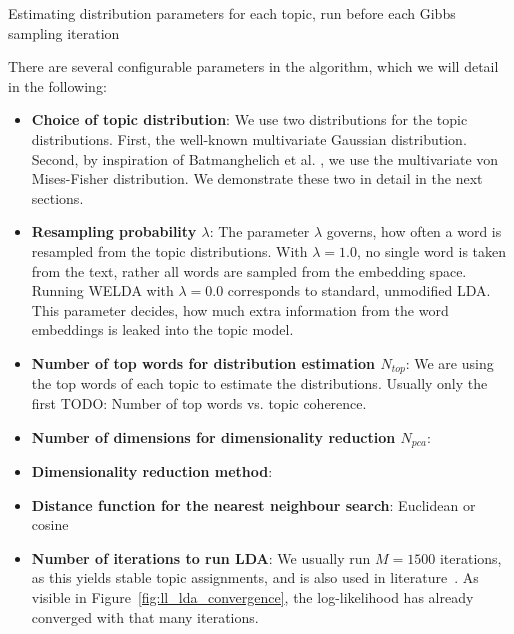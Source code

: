 \documentclass[
        a4paper,
        titlepage,
        twoside,
        parskip
        ]{scrbook}
\theoremstyle{break}
\begin{document}
\begin{algorithm}
  \caption{Estimating distribution parameters for each topic, run before each Gibbs sampling iteration}
  \label{alg:welda_parameter_estimation}
  \begin{algorithmic}[1]
    \EndFor
    \EndProcedure
  \end{algorithmic}
\end{algorithm}

There are several configurable parameters in the algorithm, which we will detail in the following:
\begin{itemize}
  \item \textbf{Choice of topic distribution}:
    We use two distributions for the topic distributions.
    First, the well-known multivariate Gaussian distribution.
    Second, by inspiration of Batmanghelich et al. \cite{Batmanghelich2016}, we use the multivariate von Mises-Fisher distribution.
    We demonstrate these two in detail in the next sections.
  \item \textbf{Resampling probability $\lambda$}:
    The parameter $\lambda$ governs, how often a word is resampled from the topic distributions.
    With $\lambda = 1.0$, no single word is taken from the text, rather all words are sampled from the embedding space.
    Running WELDA with $\lambda = 0.0$ corresponds to standard, unmodified LDA.
    This parameter decides, how much extra information from the word embeddings is leaked into the topic model.
  \item \textbf{Number of top words for distribution estimation $N_{top}$}:
    We are using the top words of each topic to estimate the distributions.
    Usually only the first
    TODO: Number of top words vs. topic coherence.
  \item \textbf{Number of dimensions for dimensionality reduction $N_{pca}$}:
  \item \textbf{Dimensionality reduction method}:
  \item \textbf{Distance function for the nearest neighbour search}: Euclidean or cosine
  \item \textbf{Number of iterations to run LDA}:
    We usually run $M = 1500$ iterations, as this yields stable topic assignments, and is also used in literature~\cite{Nguyen2015}.
    As visible in Figure~\ref{fig:ll_lda_convergence}, the log-likelihood has already converged with that many iterations.

\end{itemize}
\end{document}
